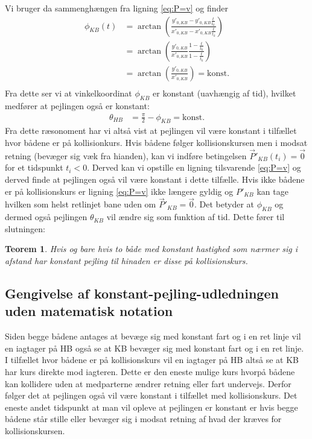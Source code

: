 \documentclass[%
 reprint,
nofootinbib,
aps,
]{revtex4-1}
\newtheorem{theorem}{Teorem}
\begin{document}
Vi bruger da sammenghængen fra ligning \ref{eq:P=v} og finder
\begin{align*}
  \phi_{KB}(t) &= \arctan{\left( \frac{y'_{0,KB} - y'_{0,KB}\frac{t}{t_k}}{x'_{0,KB} - x'_{0,KB}\frac{t}{t_k}}\right)} \\
  &= \arctan{\left(\frac{y'_{0,KB}}{x'_{0,KB}} \frac{1 - \frac{t}{t_k}}{1 - \frac{t}{t_k}}\right)} \\
  &= \arctan{\left(\frac{y'_{0,KB}}{x'_{0,KB}}\right)} = \text{konst.} \\
\end{align*}
Fra dette ser vi at vinkelkoordinat $\phi_{KB}$ er konstant (uavhængig af tid), hvilket medfører at pejlingen også er konstant:
\begin{align*}
  \theta_{HB} &= \frac{\pi}{2} - \phi_{KB} = \text{konst.}
\end{align*}
Fra dette ræsonoment har vi altså vist at pejlingen vil være konstant i tilfællet hvor bådene er på kollisionkurs. Hvis bådene følger kollisionskursen men i modsat retning (bevæger sig væk fra hianden), kan vi indføre betingelsen $\vec{P}'_{KB}(t_i) = \vec{0}$ for et tidspunkt $t_i < 0$. Derved kan vi opstille en ligning tilsvarende \ref{eq:P=v} og derved finde at pejlingen også vil være konstant i dette tilfælle. Hvis ikke bådene er på kollisionskurs er ligning \ref{eq:P=v} ikke længere gyldig og $P'_{KB}$ kan tage hvilken som helst retlinjet bane uden om $\vec{P}'_{KB} = \vec{0}$. Det betyder at $\phi_{KB}$ og dermed også pejlingen $\theta_{KB}$ vil ændre sig som funktion af tid. Dette fører til slutningen:
\begin{theorem}
  Hvis og bare hvis to både med konstant hastighed som nærmer sig i afstand har konstant pejling til hinaden er disse på kollisionskurs.
  \label{Teo:pejling}
\end{theorem}
\subsection{Gengivelse af konstant-pejling-udledningen uden matematisk notation}
Siden begge bådene antages at bevæge sig med konstant fart og i en ret linje vil en iagtager på HB også se at KB bevæger sig med konstant fart og i en ret linje. I tilfællet hvor bådene er på kollisionskurs vil en iagtager på HB altså se at KB har kurs direkte mod iagteren. Dette er den eneste mulige kurs hvorpå bådene kan kollidere uden at medparterne ændrer retning eller fart undervejs. Derfor følger det at pejlingen også vil være konstant i tilfællet med kollisionskurs. Det eneste andet tidspunkt at man vil opleve at pejlingen er konstant er hvis begge bådene står stille eller bevæger sig i modsat retning af hvad der kræves for kollisionskursen.
\end{document}
